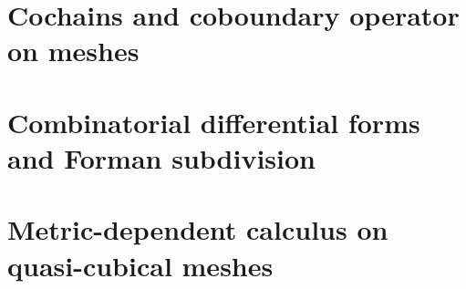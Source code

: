 \documentclass{article}
\theoremstyle{definition}
\begin{document}
\section{Cochains and coboundary operator on meshes}
\label{section:cochains_and_coboundary_operator_on_meshes}





\section{Combinatorial differential forms and Forman subdivision}
\label{section:combinatorial_differential_forms_and_forman_subdivision}





















\section{Metric-dependent calculus on quasi-cubical meshes}
\label{section:metric_dependent_calculus_on_quasi_cubical_meshes}










\end{document}
